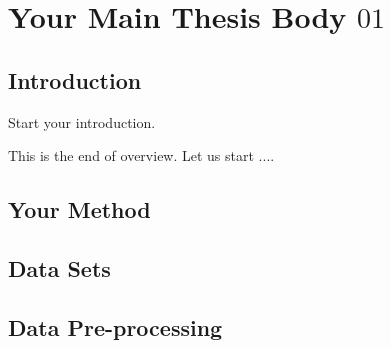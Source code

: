 \def\baselinestretch{1}

\chapter{Your Main Thesis Body $01$}

\def\baselinestretch{1.66}




\section{Introduction}


Start your introduction.


This is the end of overview. Let us start ....


\section{Your Method}





\section{Data Sets}




\section{Data Pre-processing}

